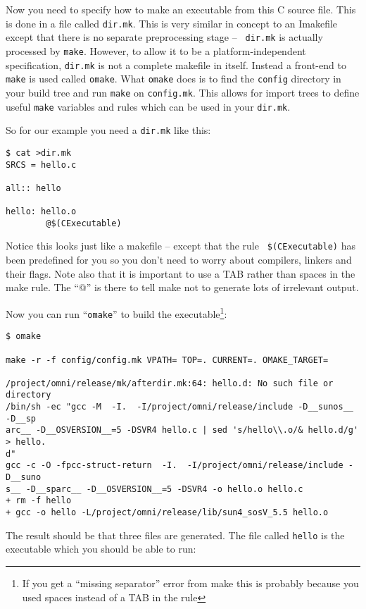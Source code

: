 \documentclass[11pt,twoside,onecolumn]{article}
\begin{document}
Now you need to specify how to make an executable from this C source file.
This is done in a file called {\tt dir.mk}.  This is very similar in concept to
an Imakefile except that there is no separate preprocessing stage -- {\tt
dir.mk} is actually processed by {\tt make}.  However, to allow it to be a
platform-independent specification, {\tt dir.mk} is not a complete makefile in
itself.  Instead a front-end to {\tt make} is used called {\tt omake}.  What
{\tt omake} does is to find the {\tt config} directory in your build tree and
run {\tt make} on {\tt config.mk}.  This allows for import trees to define
useful {\tt make} variables and rules which can be used in your {\tt dir.mk}.

So for our example you need a {\tt dir.mk} like this:

{\footnotesize \begin{verbatim}
$ cat >dir.mk
SRCS = hello.c

all:: hello

hello: hello.o
        @$(CExecutable)
\end{verbatim}}

Notice this looks just like a makefile -- except that the rule {\tt
\$(CExecutable)} has been predefined for you so you don't need to worry about
compilers, linkers and their flags.  Note also that it is important to use a
TAB rather than spaces in the make rule.  The ``@'' is there to tell make not
to generate lots of irrelevant output.

Now you can run ``{\tt omake}'' to build the executable\footnote{If you get a
``missing separator'' error from make this is probably because you used spaces
instead of a TAB in the rule}:

{\footnotesize \begin{verbatim}
$ omake

make -r -f config/config.mk VPATH= TOP=. CURRENT=. OMAKE_TARGET=

/project/omni/release/mk/afterdir.mk:64: hello.d: No such file or directory
/bin/sh -ec "gcc -M  -I.  -I/project/omni/release/include -D__sunos__ -D__sp
arc__ -D__OSVERSION__=5 -DSVR4 hello.c | sed 's/hello\\.o/& hello.d/g' > hello.
d"
gcc -c -O -fpcc-struct-return  -I.  -I/project/omni/release/include -D__suno
s__ -D__sparc__ -D__OSVERSION__=5 -DSVR4 -o hello.o hello.c
+ rm -f hello 
+ gcc -o hello -L/project/omni/release/lib/sun4_sosV_5.5 hello.o 
\end{verbatim}}

The result should be that three files are generated.  The file called
{\tt hello} is the executable which you should be able to run:
\end{document}
